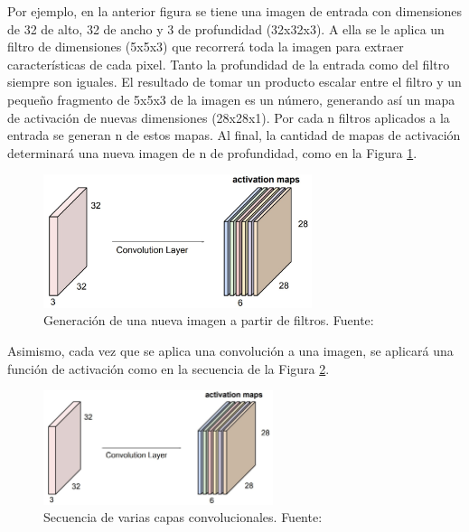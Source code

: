 \begin{itemize}
\begin{itemize}
\begin{itemize}
			Por ejemplo, en la anterior figura se tiene una imagen de entrada con dimensiones de 32 de alto, 32 de ancho y 3 de profundidad (32x32x3). A ella se le aplica un filtro de dimensiones (5x5x3) que recorrerá toda la imagen para extraer características de cada pixel. Tanto la profundidad de la entrada como del filtro siempre son iguales. El resultado de tomar un producto escalar entre el filtro y un pequeño fragmento de 5x5x3 de la imagen es un número, generando así un mapa de activación de nuevas dimensiones (28x28x1). Por cada n filtros aplicados a la entrada se generan n de estos mapas. Al final, la cantidad de mapas de activación determinará una nueva imagen de n de profundidad, como en la Figura \ref{2:fig26}.
			\begin{figure}[h]
				\begin{center}
					\includegraphics[width=0.7\textwidth]{2/figures/filtros_cnn.jpg}
					\caption[Generación de una nueva imagen a partir de filtros]{Generación de una nueva imagen a partir de filtros. Fuente: \cite{tec_li2019cnn}}
					\label{2:fig26}
				\end{center}
			\end{figure}
			
			Asimismo, cada vez que se aplica una convolución a una imagen, se aplicará una función de activación como en la secuencia de la Figura \ref{2:fig27}.
			\begin{figure}[h]
				\begin{center}
					\includegraphics[width=0.60\textwidth]{2/figures/filtros_cnn.jpg}
					\caption[Secuencia de varias capas convolucionales]{Secuencia de varias capas convolucionales. Fuente: \cite{tec_li2019cnn}}
					\label{2:fig27}
				\end{center}
			\end{figure}
			

\end{itemize}
\end{itemize}
\end{itemize}
